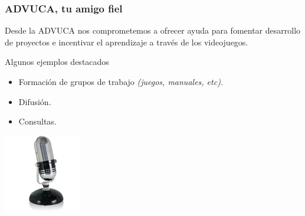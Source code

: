 
\begin{frame}
	\frametitle{ADVUCA, tu amigo fiel}
		
	Desde la ADVUCA nos comprometemos a ofrecer ayuda para fomentar desarrollo de proyectos e incentivar el aprendizaje a través de los videojuegos.

	\begin{block}{Algunos ejemplos destacados}
		\begin{itemize}
			\item Formación de grupos de trabajo \emph{(juegos, manuales, etc).}
			\item Difusión.
			\item Consultas.
		\end{itemize}
	\end{block}

	\begin{center}
		\includegraphics[scale=0.50]{img/micro.png}
	\end{center}

\end{frame}


